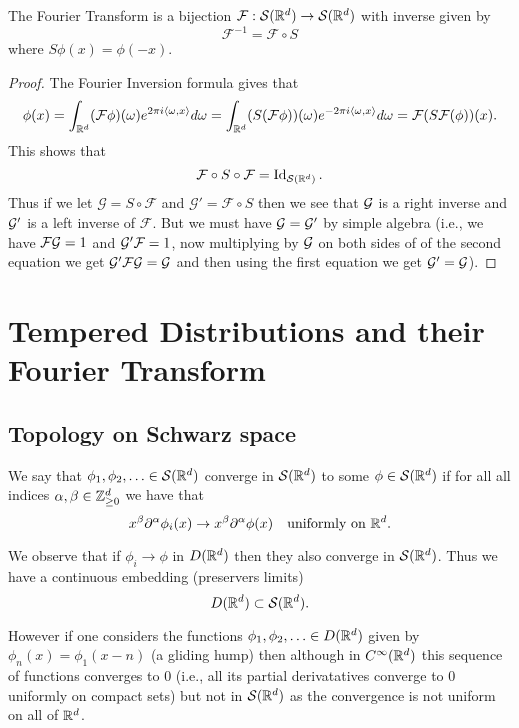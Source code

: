 \documentclass[twoside, a4paper, 10pt]{amsart}
\begin{document}
\begin{corol} The Fourier Transform is a bijection $\mathcal{F}:\mathcal{S}(\mathbb{R}^d) \to \mathcal{S}(\mathbb{R}^d)$ with inverse given by $$\mathcal{F}^{-1} = \mathcal{F} \circ S$$ where $S\phi (x) = \phi(-x)$.

\end{corol}

\begin{proof} The Fourier Inversion formula gives that $$\phi(x) = \int_{\mathbb{R}^d} (\mathcal{F}\phi) (\omega) e^{2\pi  i \langle \omega, x \rangle} d\omega = \int_{\mathbb{R}^d} (S(\mathcal{F}\phi))(\omega) e^{-2\pi i \langle\omega, x \rangle} d \omega = \mathcal{F}(S\mathcal{F}(\phi))(x).$$ This shows that $$\mathcal{F} \circ S \circ \mathcal{F} = \operatorname{Id}_{\mathcal{S}(\mathbb{R}^d)}.$$ Thus if we let $\mathcal{G} = S \circ \mathcal{F}$ and $\mathcal{G}' = \mathcal{F} \circ S$ then we see that $\mathcal{G}$ is a right inverse and $\mathcal{G}'$ is a left inverse of $\mathcal{F}$. But we must have $\mathcal{G} = \mathcal{G}'$ by simple algebra (i.e., we have $\mathcal{F} \mathcal{G} = 1$ and $\mathcal{G}' \mathcal{F} = 1$, now multiplying by $\mathcal{G}$ on both sides of of the second equation we get $\mathcal{G}' \mathcal{F} \mathcal{G} = \mathcal{G}$ and then using the first equation we get $\mathcal{G}' = \mathcal{G}$). \end{proof}

\section{Tempered Distributions and their Fourier Transform}

\subsection{Topology on Schwarz space}

\begin{mydef} We say that $\phi_1, \phi_2, \ldots \in \mathcal{S}(\mathbb{R}^d)$ converge in $\mathcal{S}(\mathbb{R}^d)$ to some $\phi \in \mathcal{S}(\mathbb{R}^d)$ if for all all indices $\alpha, \beta \in \mathbb{Z}_{\geq 0}^d$ we have that $$x^{\beta}\partial^{\alpha}\phi_i (x) \to x^{\beta}\partial^{\alpha}\phi (x) \quad \text{uniformly on } \mathbb{R}^d.$$

\end{mydef}

We observe that if $\phi_i \to \phi$ in $D(\mathbb{R}^d)$ then they also converge in $\mathcal{S}(\mathbb{R}^d)$.  Thus we have a continuous embedding (preservers limits) $$D(\mathbb{R}^d) \subset \mathcal{S}(\mathbb{R}^d).$$

However if one considers the functions $\phi_1, \phi_2, \ldots \in D(\mathbb{R}^d)$ given by $\phi_n (x) =\phi_1 (x-n)$ (a gliding hump) then although in $C^{\infty}(\mathbb{R}^d)$ this sequence of functions converges to $0$ (i.e., all its partial derivatatives converge to $0$ uniformly on compact sets) but not in $\mathcal{S}(\mathbb{R}^d)$ as the convergence is not uniform on all of $\mathbb{R}^d$.
\end{document}
